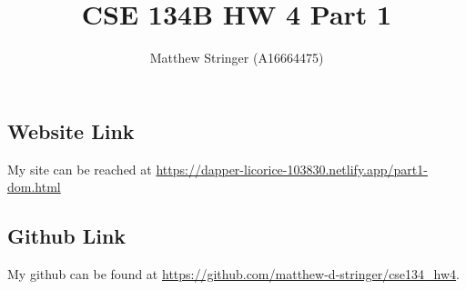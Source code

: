 \documentclass{article}
\title{CSE 134B HW 4 Part 1}
\author{
  Matthew Stringer (A16664475)
}
\theoremstyle{definition}
\begin{document}
    \maketitle
    \subsection*{Website Link}
    My site can be reached at \url{https://dapper-licorice-103830.netlify.app/part1-dom.html}
    \subsection*{Github Link}
    My github can be found at \url{https://github.com/matthew-d-stringer/cse134_hw4}.
\end{document}
